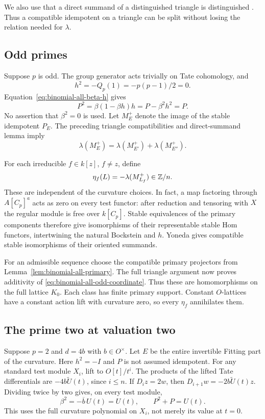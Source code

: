 We also use that a direct summand of a distinguished triangle
is distinguished
\citep[Lemma~1.6 and proof, pp.~821--822]{BalmerSchlichting2001}.
Thus a compatible idempotent on a triangle can be split
without losing the relation needed for $\lambda$.

\subsection{Odd primes}

Suppose $p$ is odd.  The group generator acts trivially on
Tate cohomology, and
\[
 h^2=-Q_p(1)=-p(p-1)/2=0.
\]
Equation~\eqref{eq:binomial-all-beta-h} gives
\[
 P^2=\beta(1-\beta h)h=P-\beta^2h^2=P.
\]
No assertion that $\beta^2=0$ is used.
Let $M_E^+$ denote the image of the stable idempotent $P_E$.
The preceding triangle compatibilities and direct-summand
lemma imply
\[
 \lambda(M_E^+)=\lambda(M_{E'}^+)+\lambda(M_{E''}^+).
\]

For each irreducible $f\in k[z]$, $f\ne z$, define
\begin{equation}\label{eq:binomial-all-odd-coordinate}
 \eta_f(L)=-\lambda(M_{L_f}^+)\in\mathbb Z/n.
\end{equation}
These are independent of the curvature choices.
In fact, a map factoring through $A[C_p]^a$ acts as zero on
every test functor: after reduction and tensoring with $X$
the regular module is free over $k[C_p]$.
Stable equivalences of the primary components therefore
give isomorphisms of their representable stable Hom functors,
intertwining the natural Bockstein and $h$.
Yoneda gives compatible stable isomorphisms of their
oriented summands.

For an admissible sequence choose the compatible primary
projectors from Lemma~\ref{lem:binomial-all-primary}.
The full triangle argument now proves additivity of
\eqref{eq:binomial-all-odd-coordinate}.
Thus these are homomorphisms on the full lattice $K_0$.
Each class has finite primary support.  Constant $O$-lattices
have a constant action lift with curvature zero, so every
$\eta_f$ annihilates them.

\subsection{The prime two at valuation two}

Suppose $p=2$ and $d=4b$ with $b\in O^\times$.
Let $E$ be the entire invertible Fitting part of the curvature.
Here $h^2=-I$ and $P$ is not assumed idempotent.
For any standard test module $X_i$, lift to $O[t]/t^i$.
The products of the lifted Tate differentials are
$-4b\widetilde U(t)$, since $i\le n$.
If $D_i z=2w$, then
$D_{i+1}w=-2b\widetilde U(t)z$.
Dividing twice by two gives, on every test module,
\[
 \beta^2=-\overline b\,U(t)=U(t),\qquad
 P^2+P=U(t).
\]
This uses the full curvature polynomial on $X_i$, not merely
its value at $t=0$.

